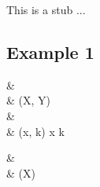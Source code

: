 This is a stub ...

\subsection{Example 1}

\begin{codealign}
  &
    \codata\ \FunXY\ \where
  \\[-4pt]
  &\quad
    \Apply(\prd X, \con Y)
  \\
  &
    \identity
    \prd
    \FunXX
    \coloneq \match
  \\[-4pt]
  &\quad
    \Apply(x, k)
    \Rightarrow
    x
    \mkCmd
    k
\end{codealign}

\begin{codealign}
  &
    \codata\ \RecordX\ \where
  \\[-4pt]
  &\quad
    \Get(\con X)
\end{codealign}
